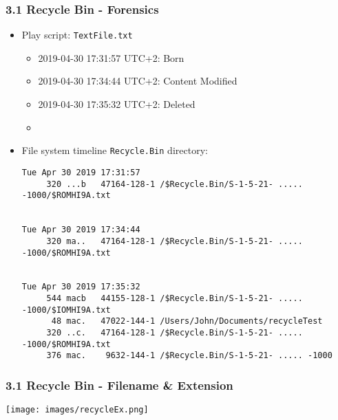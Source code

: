 \begin{frame}[fragile]
  \frametitle{3.1 Recycle Bin - Forensics}
    \begin{itemize}
        \item Play script: \texttt{TextFile.txt} 
            \begin{itemize}
		\item 2019-04-30 17:31:57 UTC+2:  Born
		\item 2019-04-30 17:34:44 UTC+2:  Content Modified
		\item 2019-04-30 17:35:32 UTC+2:  Deleted
		\item[]
            \end{itemize}
        \item File system timeline \texttt{Recycle.Bin} directory:
  \begin{lstlisting}[basicstyle=\tiny]
Tue Apr 30 2019 17:31:57
     320 ...b   47164-128-1 /$Recycle.Bin/S-1-5-21- ..... -1000/$ROMHI9A.txt


Tue Apr 30 2019 17:34:44
     320 ma..   47164-128-1 /$Recycle.Bin/S-1-5-21- ..... -1000/$ROMHI9A.txt


Tue Apr 30 2019 17:35:32
     544 macb   44155-128-1 /$Recycle.Bin/S-1-5-21- ..... -1000/$IOMHI9A.txt
      48 mac.   47022-144-1 /Users/John/Documents/recycleTest
     320 ..c.   47164-128-1 /$Recycle.Bin/S-1-5-21- ..... -1000/$ROMHI9A.txt
     376 mac.    9632-144-1 /$Recycle.Bin/S-1-5-21- ..... -1000
  \end{lstlisting}
    \end{itemize}
\end{frame}


\begin{frame}[fragile]
	\frametitle{3.1 Recycle Bin - Filename \& Extension}
    \texttt{[image: images/recycleEx.png]}
\end{frame}


